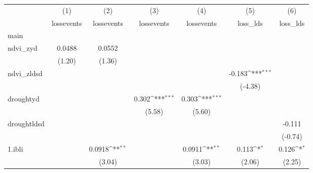 {
\def\sym#1{\ifmmode^{#1}\else\(^{#1}\)\fi}
\begin{tabular}{l*{6}{c}}
\hline\hline
            &\multicolumn{1}{c}{(1)}&\multicolumn{1}{c}{(2)}&\multicolumn{1}{c}{(3)}&\multicolumn{1}{c}{(4)}&\multicolumn{1}{c}{(5)}&\multicolumn{1}{c}{(6)}\\
            &\multicolumn{1}{c}{lossevents}&\multicolumn{1}{c}{lossevents}&\multicolumn{1}{c}{lossevents}&\multicolumn{1}{c}{lossevents}&\multicolumn{1}{c}{loss\_lds}&\multicolumn{1}{c}{loss\_lds}\\
\hline
main        &                     &                     &                     &                     &                     &                     \\
ndvi\_zyd    &      0.0488         &      0.0552         &                     &                     &                     &                     \\
            &      (1.20)         &      (1.36)         &                     &                     &                     &                     \\
[1em]
ndvi\_zldsd  &                     &                     &                     &                     &      -0.183\sym{***}&                     \\
            &                     &                     &                     &                     &     (-4.38)         &                     \\
[1em]
droughtyd   &                     &                     &       0.302\sym{***}&       0.303\sym{***}&                     &                     \\
            &                     &                     &      (5.58)         &      (5.60)         &                     &                     \\
[1em]
droughtldsd &                     &                     &                     &                     &                     &      -0.111         \\
            &                     &                     &                     &                     &                     &     (-0.74)         \\
[1em]
1.ibli      &                     &      0.0918\sym{**} &                     &      0.0911\sym{**} &       0.113\sym{*}  &       0.126\sym{*}  \\
            &                     &      (3.04)         &                     &      (3.03)         &      (2.06)         &      (2.25)         \\

\end{tabular}}
